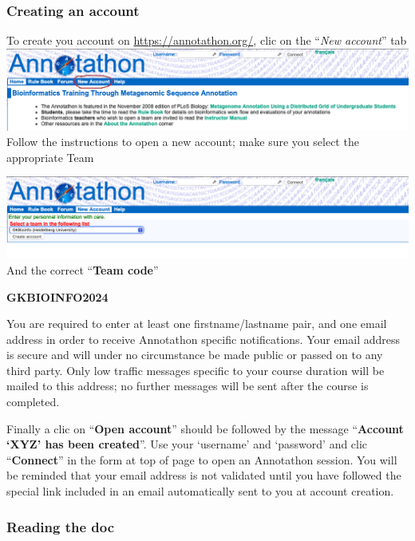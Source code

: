 \documentclass[
]{book}
\begin{document}
\hypertarget{creating-an-account}{%
\subsubsection{Creating an account}\label{creating-an-account}}

To create you account on \url{https://annotathon.org/}, clic on the ``\emph{New account}'' tab
\includegraphics{figures/Annotathon/Annot_create_account.png}
Follow the instructions to open a new account; make sure you select the appropriate Team

\includegraphics{figures/Annotathon/Annot_select_affiliation.png}
And the correct ``\textbf{Team code}''

\textbf{GKBIOINFO2024}

You are required to enter at least one firstname/lastname pair, and one email address in order to receive Annotathon specific notifications. Your email address is secure and will under no circumstance be made public or passed on to any third party. Only low traffic messages specific to your course duration will be mailed to this address; no further messages will be sent after the course is completed.

Finally a clic on ``\textbf{Open account}'' should be followed by the message ``\textbf{Account `XYZ' has been created}''. Use your `username' and `password' and clic ``\textbf{Connect}'' in the form at top of page to open an Annotathon session. You will be reminded that your email address is not validated until you have followed the special link included in an email automatically sent to you at account creation.

\hypertarget{reading-the-doc}{%
\subsubsection{Reading the doc}\label{reading-the-doc}}
\end{document}
